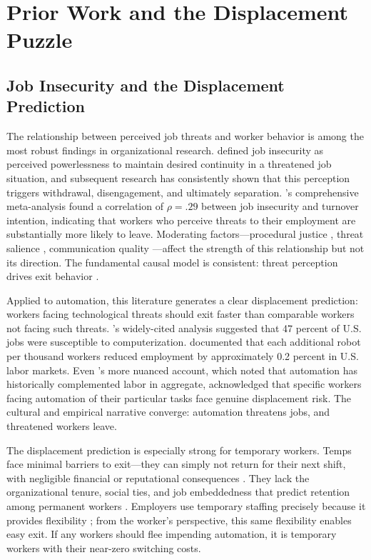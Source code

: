 \documentclass[12pt]{article}
\begin{document}
\section{Prior Work and the Displacement Puzzle}

\subsection{Job Insecurity and the Displacement Prediction}

The relationship between perceived job threats and worker behavior is among the most robust findings in organizational research. \citet{greenhalgh1984job} defined job insecurity as perceived powerlessness to maintain desired continuity in a threatened job situation, and subsequent research has consistently shown that this perception triggers withdrawal, disengagement, and ultimately separation. \citet{sverke2002job}'s comprehensive meta-analysis found a correlation of $\rho = .29$ between job insecurity and turnover intention, indicating that workers who perceive threats to their employment are substantially more likely to leave. Moderating factors---procedural justice \citep{brockner1994interactive}, threat salience \citep{ashford1989content}, communication quality \citep{dekker2002managing}---affect the strength of this relationship but not its direction. The fundamental causal model is consistent: threat perception drives exit behavior \citep{griffeth2000meta, hom2017review, mobley1979review}.

Applied to automation, this literature generates a clear displacement prediction: workers facing technological threats should exit faster than comparable workers not facing such threats. \citet{frey2017future}'s widely-cited analysis suggested that 47 percent of U.S. jobs were susceptible to computerization. \citet{acemoglu2020robots} documented that each additional robot per thousand workers reduced employment by approximately 0.2 percent in U.S. labor markets. Even \citet{autor2015jobs}'s more nuanced account, which noted that automation has historically complemented labor in aggregate, acknowledged that specific workers facing automation of their particular tasks face genuine displacement risk. The cultural and empirical narrative converge: automation threatens jobs, and threatened workers leave.

The displacement prediction is especially strong for temporary workers. Temps face minimal barriers to exit---they can simply not return for their next shift, with negligible financial or reputational consequences \citep{kalleberg2000nonstandard, kalleberg2009precarious}. They lack the organizational tenure, social ties, and job embeddedness that predict retention among permanent workers \citep{mitchell2001turnover, lee2004unfolding}. Employers use temporary staffing precisely because it provides flexibility \citep{houseman2001contingent}; from the worker's perspective, this same flexibility enables easy exit. If any workers should flee impending automation, it is temporary workers with their near-zero switching costs.
\end{document}
